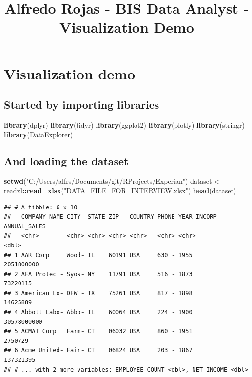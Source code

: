 \documentclass[]{article}
\title{Alfredo Rojas - BIS Data Analyst - Visualization Demo}
\author{}
\date{}
\newenvironment{Shaded}{\begin{snugshade}}{\end{snugshade}}
\newcommand{\KeywordTok}[1]{\textcolor[rgb]{0.13,0.29,0.53}{\textbf{#1}}}
\newcommand{\NormalTok}[1]{#1}
\newcommand{\OperatorTok}[1]{\textcolor[rgb]{0.81,0.36,0.00}{\textbf{#1}}}
\newcommand{\StringTok}[1]{\textcolor[rgb]{0.31,0.60,0.02}{#1}}
\begin{document}
\maketitle

\hypertarget{visualization-demo}{%
\section{Visualization demo}\label{visualization-demo}}

\hypertarget{started-by-importing-libraries}{%
\subsection{Started by importing
libraries}\label{started-by-importing-libraries}}

\begin{Shaded}
\begin{Highlighting}[]
\KeywordTok{library}\NormalTok{(dplyr)}
\KeywordTok{library}\NormalTok{(tidyr)}
\KeywordTok{library}\NormalTok{(ggplot2)}
\KeywordTok{library}\NormalTok{(plotly)}
\KeywordTok{library}\NormalTok{(stringr)}
\KeywordTok{library}\NormalTok{(DataExplorer)}
\end{Highlighting}
\end{Shaded}

\hypertarget{and-loading-the-dataset}{%
\subsection{And loading the dataset}\label{and-loading-the-dataset}}

\begin{Shaded}
\begin{Highlighting}[]
\KeywordTok{setwd}\NormalTok{(}\StringTok{"C:/Users/alfrs/Documents/git/RProjects/Experian"}\NormalTok{)}
\NormalTok{dataset <-}\StringTok{ }\NormalTok{readxl}\OperatorTok{::}\KeywordTok{read_xlsx}\NormalTok{(}\StringTok{"DATA_FILE_FOR_INTERVIEW.xlsx"}\NormalTok{)}
\KeywordTok{head}\NormalTok{(dataset)}
\end{Highlighting}
\end{Shaded}

\begin{verbatim}
## # A tibble: 6 x 10
##   COMPANY_NAME CITY  STATE ZIP   COUNTRY PHONE YEAR_INCORP ANNUAL_SALES
##   <chr>        <chr> <chr> <chr> <chr>   <chr> <chr>              <dbl>
## 1 AAR Corp     Wood~ IL    60191 USA     630 ~ 1955          2051800000
## 2 AFA Protect~ Syos~ NY    11791 USA     516 ~ 1873            73220115
## 3 American Lo~ DFW ~ TX    75261 USA     817 ~ 1898            14625889
## 4 Abbott Labo~ Abbo~ IL    60064 USA     224 ~ 1900         30578000000
## 5 ACMAT Corp.  Farm~ CT    06032 USA     860 ~ 1951             2750729
## 6 Acme United~ Fair~ CT    06824 USA     203 ~ 1867           137321395
## # ... with 2 more variables: EMPLOYEE_COUNT <dbl>, NET_INCOME <dbl>
\end{verbatim}
\end{document}
